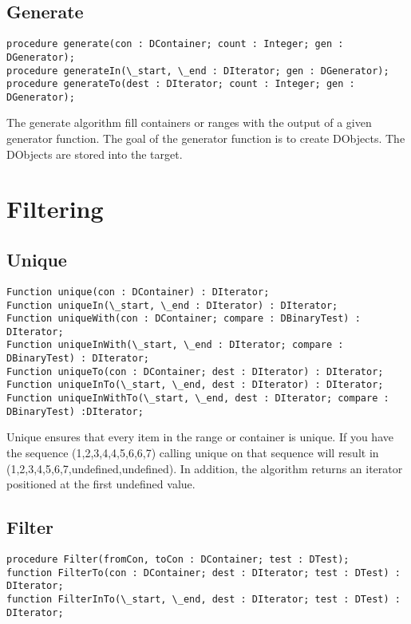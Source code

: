 \documentclass{report}
\begin{document}
\subsection{Generate}

\begin{lstlisting}
procedure generate(con : DContainer; count : Integer; gen : DGenerator);
procedure generateIn(\_start, \_end : DIterator; gen : DGenerator);
procedure generateTo(dest : DIterator; count : Integer; gen : DGenerator);
\end{lstlisting}

The generate algorithm fill containers or ranges with the output of a given
generator function. The goal of the generator function is to create
DObjects. The DObjects are stored into the target.

\section{Filtering}

\subsection{Unique}

\begin{lstlisting}
Function unique(con : DContainer) : DIterator;
Function uniqueIn(\_start, \_end : DIterator) : DIterator;
Function uniqueWith(con : DContainer; compare : DBinaryTest) : DIterator;
Function uniqueInWith(\_start, \_end : DIterator; compare : DBinaryTest) : DIterator;
Function uniqueTo(con : DContainer; dest : DIterator) : DIterator;
Function uniqueInTo(\_start, \_end, dest : DIterator) : DIterator;
Function uniqueInWithTo(\_start, \_end, dest : DIterator; compare : DBinaryTest) :DIterator;
\end{lstlisting}

Unique ensures that every item in the range or container 
is unique. If you have the sequence (1,2,3,4,4,5,6,6,7) calling unique on that sequence will 
result in (1,2,3,4,5,6,7,undefined,undefined). In addition, the algorithm 
returns an iterator positioned at the first undefined value.

\subsection{Filter}

\begin{lstlisting}
procedure Filter(fromCon, toCon : DContainer; test : DTest);
function FilterTo(con : DContainer; dest : DIterator; test : DTest) : DIterator;
function FilterInTo(\_start, \_end, dest : DIterator; test : DTest) : DIterator;
\end{lstlisting}
\end{document}
